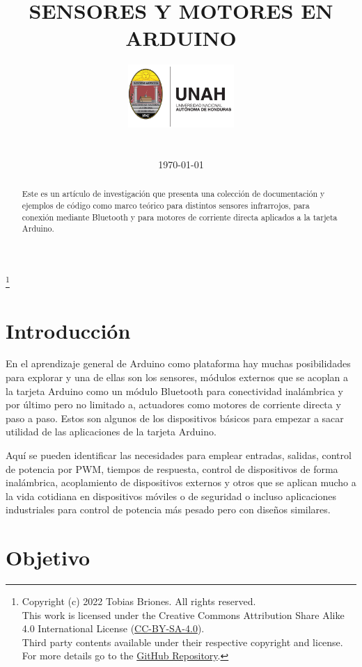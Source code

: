 \documentclass[conference]{IEEEtran}
\title{SENSORES Y MOTORES EN ARDUINO}
\author{
    \includegraphics[width = 40mm]{images/logo-unah.png}\\[8ex]
    \IEEEauthorblockN{Tobias Briones}
    \IEEEauthorblockN{tobias.briones@unah.hn}
    \IEEEauthorblockA{\textit{Universidad Nacional Autónoma de Honduras} \\
    \textit{Ingeniería de Sistemas} \\
    \textit{I PAC 2022} \\
    \textit{IS911-MICROPROCESADORES}} \\\vspace*{20pt} \normalsize  \\
    \today
}
\newcommand\blfootnote[1]{%
    \begingroup
    \renewcommand\thefootnote{}\footnote{#1}%
    \addtocounter{footnote}{-1}%
    \endgroup
}
\begin{document}
    \maketitle

    \begin{abstract}
        Este es un artículo de investigación que presenta una colección de documentación y ejemplos de código como marco teórico para distintos sensores infrarrojos, para conexión mediante Bluetooth y para motores de corriente directa aplicados a la tarjeta Arduino.
    \end{abstract}

    \tableofcontents

    \blfootnote{
        Copyright (c) 2022 Tobias Briones. All rights reserved. \\
        This work is licensed under the Creative Commons Attribution Share Alike 4.0 International License (\href{https://spdx.org/licenses/CC-BY-SA-4.0}{CC-BY-SA-4.0}). \\
        Third party contents available under their respective copyright and license.\\
        For more details go to the \href{https://github.com/tobiasbriones/cp-unah-is911-microprocessors}{GitHub Repository}.}

    \section{Introducción}

    En el aprendizaje general de Arduino como plataforma hay muchas posibilidades para explorar y una de ellas son los sensores, módulos externos que se acoplan a la tarjeta Arduino como un módulo Bluetooth para conectividad inalámbrica y por último pero no limitado a, actuadores como motores de corriente directa y paso a paso. Estos son algunos de los dispositivos básicos para empezar a sacar utilidad de las aplicaciones de la tarjeta Arduino.

    \bigbreak

    Aquí se pueden identificar las necesidades para emplear entradas, salidas, control de potencia por PWM, tiempos de respuesta, control de dispositivos de forma inalámbrica, acoplamiento de dispositivos externos y otros que se aplican mucho a la vida cotidiana en dispositivos móviles o de seguridad o incluso aplicaciones industriales para control de potencia más pesado pero con diseños similares.

    \section{Objetivo}
\end{document}
